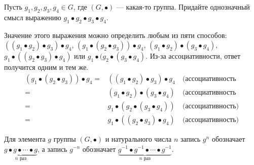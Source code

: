 \documentclass[a4paper,12pt]{article}
\begin{document}
    \problem Пусть $g_1, g_2, g_3, g_4 \in G$, где $(G, \bullet)$ --- какая-то группа. Придайте однозначный смысл выражению $g_1 \bullet g_2 \bullet g_3 \bullet g_4$.
    \begin{solution}
        Значение этого выражения можно определить любым из пяти способов: $((g_1 \bullet g_2) \bullet g_3) \bullet g_4$, $(g_1 \bullet (g_2 \bullet g_3)) \bullet g_4$, $(g_1 \bullet g_2) \bullet (g_3 \bullet g_4)$, $g_1 \bullet ((g_2 \bullet g_3) \bullet g_4)$ или $g_1 \bullet (g_2 \bullet (g_3 \bullet g_4)$. Из-за ассоциативности, ответ получится одним и тем же.
        \begin{eqnarray*}
            (g_1 \bullet (g_2 \bullet g_3)) \bullet g_4 =& ((g_1 \bullet g_2) \bullet g_3) \bullet g_4 \ &\text{(ассоциативность} \\
             =& (g_1 \bullet g_2) \bullet (g_3 \bullet g_4) \ &\text{(ассоциативность} \\
            =& g_1 \bullet (g_2 \bullet (g_3 \bullet g_4)) \ &\text{(ассоциативность)} \\
            =& g_1 \bullet ((g_2 \bullet g_3) \bullet g_4) \ &\text{(ассоциативность)}
        \end{eqnarray*}
    \end{solution}
     Для элемента $g$ группы $(G, \bullet)$ и натурального числа $n$ запись $g^n$ обозначает $\underbrace{g \bullet g \bullet \cdots \bullet g}_{n \text{ раз}}$, а запись $g^{-n}$ обозначает $\underbrace{g^{-1} \bullet g^{-1} \bullet \cdots \bullet g^{-1}}_{n \text{ раз}}$.
    
\end{document}
